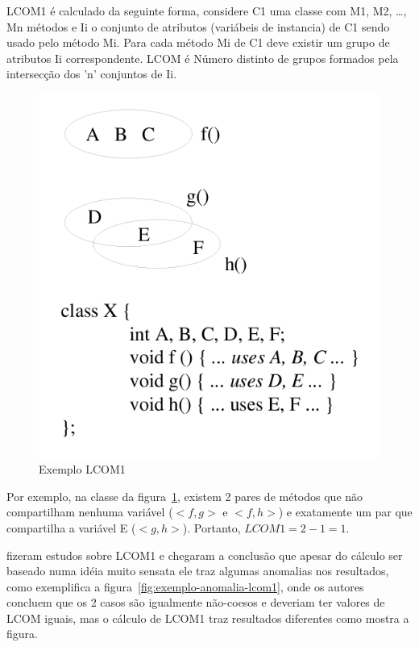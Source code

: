 LCOM1 é calculado da seguinte forma, considere C1 uma classe com M1, M2,
\ldots, Mn métodos e Ii o conjunto de atributos (variábeis de instancia) de C1
sendo usado pelo método Mi. Para cada método Mi de C1 deve existir um grupo de
atributos Ii correspondente. LCOM é Número distinto de grupos formados pela
intersecção dos 'n' conjuntos de Ii.

\begin{figure}[h]
\center
\includegraphics[scale=0.4]{imagens/exemplo-lcom1-hitz-e-montazeri}
\caption{Exemplo LCOM1 \cite{measuringCouplingAndCohesion}}
\label{fig:exemplo-lcom1}
\end{figure}

Por exemplo, na classe da figura~\ref{fig:exemplo-lcom1}, existem 2 pares de
métodos que não compartilham nenhuma variável ($<f, g>$ e $<f, h>$) e
exatamente um par que compartilha a variável E ($<g, h>$). Portanto, $LCOM1 = 2
- 1 = 1$.

 fizeram estudos sobre
LCOM1 e chegaram a conclusão que apesar do cálculo ser baseado numa idéia
muito sensata ele traz algumas anomalias nos resultados, como exemplifica a
figura~\ref{fig:exemplo-anomalia-lcom1}, onde os autores concluem que os 2
casos são igualmente não-coesos e deveriam ter valores de LCOM iguais, mas
o cálculo de LCOM1 traz resultados diferentes como mostra a figura.

